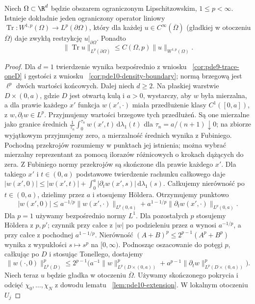 \begin{twierdzenie}
\label{thm:pde10-trace}
Niech $\Omega\subset\R^d$ będzie obszarem ograniczonym Lipschitzowskim, $1\le p<\infty$. Istnieje dokładnie jeden
ograniczony operator liniowy
$\operatorname{Tr}:W^{1,p}(\Omega)\to L^p(\partial\Omega)$,
który dla każdej $u\in C^\infty(\overline\Omega)$
(gładkiej w otoczeniu $\overline\Omega$) daje zwykłą
restrykcję $u|_{\partial\Omega}$. Ponadto
\[
 \|\operatorname{Tr}u\|_{L^p(\partial\Omega)}
 \le C(\Omega,p)\|u\|_{W^{1,p}(\Omega)}.
\]
\end{twierdzenie}
\begin{proof}
Dla $d=1$ twierdzenie wynika bezpośrednio z wniosku
~\ref{cor:pde9-trace-oneD} i gęstości z wniosku
~\ref{cor:pde10-density-boundary}; normą brzegową jest
$\ell^p$ dwóch wartości końcowych. Dalej niech $d\ge2$.
Na płaskiej warstwie $D\times(0,a)$, gdzie $D$ jest
otwartą kulą i $a>0$, wystarczy, aby $w$ była mierzalna,
a dla prawie każdego $x'$ funkcja $w(x',\cdot)$ miała
przedłużenie klasy $C^1([0,a])$, z $w,\partial_tw\in L^p$.
Przyjmujemy wartości brzegowe tych przedłużeń.
Są one mierzalne jako granice średnich
$\frac1{\tau_n}\int_0^{\tau_n}w(x',t)\,\mathrm d\lambda_1(t)$
dla $\tau_n=a/(n+1)\downarrow0$; na zbiorze wyjątkowym
przyjmujemy zero, a mierzalność średnich wynika
z Fubiniego. Pochodną przekrojów rozumiemy w punktach
jej istnienia; można wybrać mierzalny reprezentant
za pomocą ilorazów różnicowych o krokach dążących
do zera. Z Fubiniego normy przekrojów są skończone
dla prawie każdego $x'$.
Dla takiego $x'$ i $t\in(0,a)$ podstawowe twierdzenie
rachunku całkowego daje
$|w(x',0)|\le|w(x',t)|+
\int_0^a|\partial_tw(x',s)|\,\mathrm d\lambda_1(s)$.
Całkujemy nierówność po $t\in(0,a)$, dzielimy przez $a$
i stosujemy H\"oldera. Otrzymujemy punktowo
\[
 |w(x',0)|\le a^{-1/p}\|w(x',\cdot)\|_{L^p(0,a)}
 +a^{1-1/p}\|\partial_tw(x',\cdot)\|_{L^p(0,a)}.
\]
Dla $p=1$ używamy bezpośrednio normy $L^1$.
Dla pozostałych $p$ stosujemy Höldera z $p,p'$;
czynnik przy całce z $|w|$ po podzieleniu przez $a$
wynosi $a^{-1/p}$, a przy całce z pochodnej $a^{1-1/p}$.
Nierówność $(A+B)^p\le2^{p-1}(A^p+B^p)$ wynika
z wypukłości $s\mapsto s^p$ na $[0,\infty)$.
Podnosząc oszacowanie do potęgi $p$, całkując po $D$
i stosując Tonellego, dostajemy
\[
 \|w(\cdot,0)\|_{L^p(D)}^p
 \le 2^{p-1}\bigl(a^{-1}\|w\|_{L^p(D\times(0,a))}^p
 +a^{p-1}\|\partial_tw\|_{L^p(D\times(0,a))}^p\bigr).
\]
Niech teraz $u$ będzie gładka w otoczeniu
$\overline\Omega$. Używamy skończonego pokrycia i odcięć
$\chi_0,\ldots,\chi_N$ z dowodu lematu
~\ref{lem:pde10-extension}. W lokalnym otoczeniu $U_j$

\end{proof}
